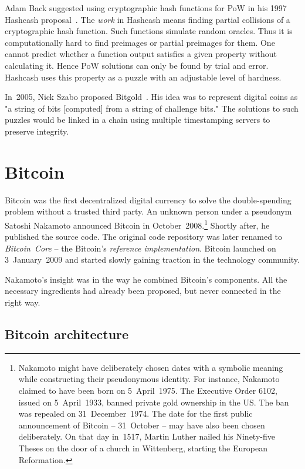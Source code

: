 Adam Back suggested using cryptographic hash functions for PoW in his 1997 Hashcash proposal~\cite{Back1997}.
The \textit{work} in Hashcash means finding partial collisions of a cryptographic hash function.
Such functions simulate random oracles.
Thus it is computationally hard to find preimages or partial preimages for them.
One cannot predict whether a function output satisfies a given property without calculating it.
Hence PoW solutions can only be found by trial and error.
Hashcash uses this property as a puzzle with an adjustable level of hardness.

In~2005, Nick Szabo proposed Bitgold~\cite{Szabo2005}.
His idea was to represent digital coins as "a string of bits [computed] from a string of challenge bits."
The solutions to such puzzles would be linked in a chain using multiple timestamping servers to preserve integrity.


\section{Bitcoin}
\label{sec:Bitcoin}

Bitcoin was the first decentralized digital currency to solve the double-spending problem without a trusted third party.
An unknown person under a pseudonym Satoshi Nakamoto announced Bitcoin in October~2008.\footnote{Nakamoto might have deliberately chosen dates with a symbolic meaning while constructing their pseudonymous identity. For instance, Nakamoto claimed to have been born on 5~April~1975. The Executive Order 6102, issued on 5~April~1933, banned private gold ownership in the US\@. The ban was repealed on 31~December~1974. The date for the first public announcement of Bitcoin -- 31~October -- may have also been chosen deliberately. On that day in~1517, Martin Luther nailed his Ninety-five Theses on the door of a church in Wittenberg, starting the European Reformation.}
Shortly after, he published the source code.
The original code repository was later renamed to \textit{Bitcoin~Core} -- the Bitcoin's \textit{reference implementation}.
Bitcoin launched on 3~January~2009 and started slowly gaining traction in the technology community.

Nakamoto's insight was in the way he combined Bitcoin's components.
All the necessary ingredients had already been proposed, but never connected in the right way.


\subsection{Bitcoin architecture}

